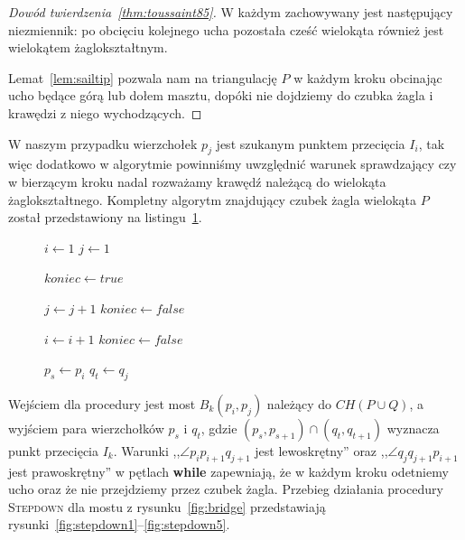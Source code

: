 \begin{proof}[Dowód twierdzenia~\ref{thm:toussaint85}]
  W każdym zachowywany jest następujący niezmiennik: po obcięciu
  kolejnego ucha pozostała cześć wielokąta również jest wielokątem
  żaglokształtnym.

  Lemat~\ref{lem:sailtip} pozwala nam na triangulację $P$ w każdym
  kroku obcinając ucho będące górą lub dołem masztu, dopóki nie
  dojdziemy do czubka żagla i krawędzi z niego wychodzących.
\end{proof}

W naszym przypadku wierzchołek $p_j$ jest szukanym punktem przecięcia
$I_i$, tak więc dodatkowo w algorytmie powinniśmy uwzględnić warunek
sprawdzający czy w bierzącym kroku nadal rozważamy krawędź należącą do
wielokąta żaglokształtnego. Kompletny algorytm znajdujący czubek żagla
wielokąta $P$ został przedstawiony na listingu~\ref{alg:stepdown}.

\begin{figure}[htp]
  \begin{algorithmic}[1]

    \State $i \gets 1$
    \State $j \gets 1$


    \Repeat
    \State $koniec \gets true$


    \State $j \gets j + 1$
    \State $koniec \gets false$
    \EndWhile


    \State $i \gets i + 1$
    \State $koniec \gets false$
    \EndWhile



    \State $p_s \gets p_i$
    \State $q_t \gets q_j$

    \EndProcedure
  \end{algorithmic}
  \caption{\label{alg:stepdown}}
\end{figure}

Wejściem dla procedury jest most $B_k(p_i,p_j)$ należący do $CH(P \cup
Q)$, a wyjściem para wierzchołków $p_s$ i $q_t$, gdzie $(p_s,p_{s+1})
\cap (q_t,q_{t+1})$ wyznacza punkt przecięcia $I_k$. Warunki ,,$\angle
p_{i}p_{i+1}q_{j+1}$ jest lewoskrętny'' oraz ,,$\angle
q_{j}q_{j+1}p_{i+1}$ jest prawoskrętny'' w pętlach \textbf{while}
zapewniają, że w każdym kroku odetniemy ucho oraz że nie przejdziemy
przez czubek żagla. Przebieg działania procedury \textsc{Stepdown} dla
mostu z rysunku~\ref{fig:bridge} przedstawiają
rysunki~\ref{fig:stepdown1}--\ref{fig:stepdown5}.

